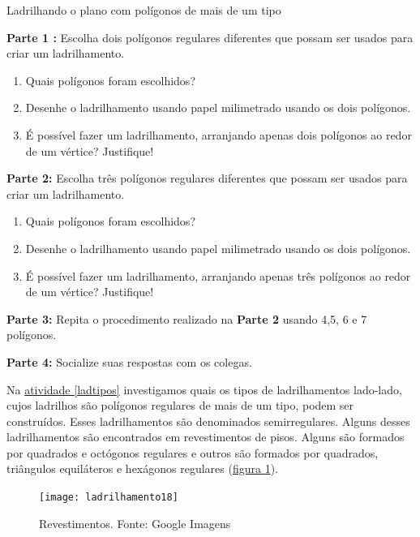 




\begin{task}{Ladrilhando o plano com polígonos de mais de um tipo}\label{ladtipos}

\textbf{Parte 1 :} Escolha dois polígonos regulares diferentes que possam ser usados para criar um ladrilhamento. 
\begin{enumerate}
\item Quais polígonos foram escolhidos?
\item Desenhe o ladrilhamento usando papel milimetrado usando os dois polígonos. 
\item É possível fazer um ladrilhamento, arranjando  apenas dois polígonos ao redor de um vértice? Justifique! 
\end{enumerate}

\textbf{Parte 2:} Escolha três polígonos regulares diferentes que possam ser usados para criar um ladrilhamento. 
\begin{enumerate}
\item Quais polígonos foram escolhidos?
\item Desenhe o ladrilhamento usando papel milimetrado usando os dois polígonos. 
\item É possível fazer um ladrilhamento, arranjando  apenas três polígonos ao redor de um vértice? Justifique! 
\end{enumerate}


\textbf{Parte 3:} Repita o procedimento realizado na \textbf{Parte 2 }usando 4,5, 6 e 7 polígonos.

\textbf{Parte 4:} Socialize suas respostas com os colegas.

\end{task}



Na \hyperref[ladtipos]{atividade \ref{ladtipos}} investigamos  quais os tipos de ladrilhamentos lado-lado, cujos ladrilhos são polígonos regulares de mais de um tipo, podem ser construídos. Esses ladrilhamentos são denominados semirregulares. Alguns desses ladrilhamentos são encontrados em revestimentos de pisos. Alguns são formados por quadrados e octógonos regulares  e outros são formados por quadrados, triângulos equiláteros e hexágonos regulares (\hyperref[lad_tp1]{figura \ref{lad_tp1}}).


\begin{figure}[H]
\centering
\texttt{[image: ladrilhamento18]}
\caption{Revestimentos. Fonte: Google Imagens}
\label{lad_tp1}
\end{figure}

